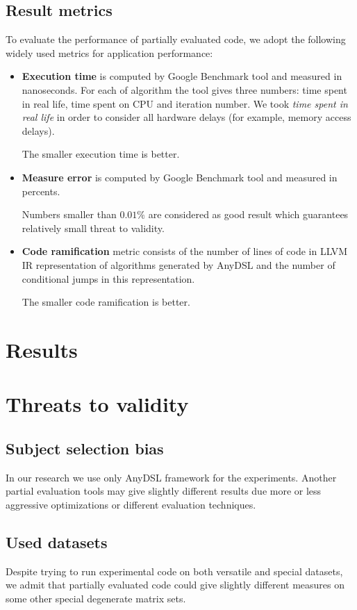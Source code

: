 \documentclass[conference]{IEEEtran}
\begin{document}
\subsection{Result metrics}
To evaluate the performance of partially evaluated code, we adopt the following widely used metrics for application performance:
\begin{itemize}
	\item \textbf{Execution time} is computed by Google Benchmark tool and measured in nanoseconds. For each of algorithm the tool gives three numbers: time spent in real life, time spent on CPU and iteration number. We took \textit{time spent in real life} in order to consider all hardware delays (for example, memory access delays).
	
	The smaller execution time is better.
	
	\item \textbf{Measure error} is computed by Google Benchmark tool and measured in percents. 
	
	Numbers smaller than $0.01\%$ are considered as good result which guarantees relatively small threat to validity.
	
	\item \textbf{Code ramification} metric consists of the number of lines of code in LLVM IR representation of algorithms generated by AnyDSL and the number of conditional jumps in this representation.
	
	The smaller code ramification is better.
\end{itemize}

\section{Results}

\section{Threats to validity}

\subsection{Subject selection bias}
In our research we use only AnyDSL framework for the experiments. Another partial evaluation tools may give slightly different results due more or less aggressive optimizations or different evaluation techniques.

\subsection{Used datasets}
Despite trying to run experimental code on both versatile and special datasets, we admit that partially evaluated code could give slightly different measures on some other special degenerate matrix sets.
\end{document}
